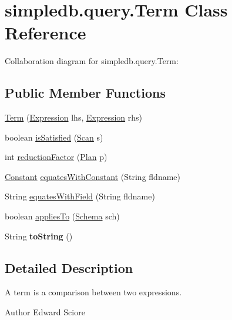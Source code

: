 \hypertarget{classsimpledb_1_1query_1_1Term}{}\section{simpledb.\+query.\+Term Class Reference}
\label{classsimpledb_1_1query_1_1Term}


Collaboration diagram for simpledb.\+query.\+Term\+:
\subsection*{Public Member Functions}
\begin{DoxyCompactItemize}
\item 
\hyperlink{classsimpledb_1_1query_1_1Term_a9e05b76143543f071858b832bd63ecdf}{Term} (\hyperlink{classsimpledb_1_1query_1_1Expression}{Expression} lhs, \hyperlink{classsimpledb_1_1query_1_1Expression}{Expression} rhs)
\item 
boolean \hyperlink{classsimpledb_1_1query_1_1Term_a197592ae9c263bbfb91ac948c6c90b35}{is\+Satisfied} (\hyperlink{interfacesimpledb_1_1query_1_1Scan}{Scan} s)
\item 
int \hyperlink{classsimpledb_1_1query_1_1Term_a6d48a55de2d5b3a475cd42fc93c36010}{reduction\+Factor} (\hyperlink{interfacesimpledb_1_1plan_1_1Plan}{Plan} p)
\item 
\hyperlink{classsimpledb_1_1query_1_1Constant}{Constant} \hyperlink{classsimpledb_1_1query_1_1Term_ae746c87c9815e12ec762612d6a53ecc4}{equates\+With\+Constant} (String fldname)
\item 
String \hyperlink{classsimpledb_1_1query_1_1Term_a744943bf6c77d103c05db6cc0fb29ac5}{equates\+With\+Field} (String fldname)
\item 
boolean \hyperlink{classsimpledb_1_1query_1_1Term_a9683bc9e3d7e67339ae9c167edc718e3}{applies\+To} (\hyperlink{classsimpledb_1_1record_1_1Schema}{Schema} sch)
\item 
\mbox{\label{classsimpledb_1_1query_1_1Term_ae02c99bebc767b19067b802acc41b71d}} 
String {\bfseries to\+String} ()
\end{DoxyCompactItemize}


\subsection{Detailed Description}
A term is a comparison between two expressions. \begin{DoxyAuthor}{Author}
Edward Sciore 
\end{DoxyAuthor}


